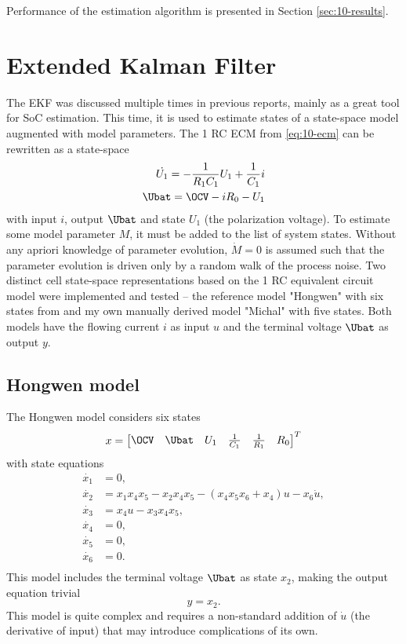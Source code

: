 Performance of the estimation algorithm is presented in Section \ref{sec:10-results}.

\section{Extended Kalman Filter}
\label{sec:10-ekf}

The EKF was discussed multiple times in previous reports, mainly as a great tool for SoC estimation. This time, it is used to estimate states of a state-space model augmented with model parameters. 
The 1 RC ECM from \eqref{eq:10-ecm} can be rewritten as a state-space
\begin{align}
    \dot{U_1} = - \frac{1}{R_1 C_1} U_1 + \frac{1}{C_1} i \\
    \Ubat = \OCV - i R_0 - U_1
    \label{eq:10-ss}
\end{align}
with input $i$, output $\Ubat$ and state $U_1$ (the polarization voltage). To estimate some model parameter $M$, it must be added to the list of system states. Without any apriori knowledge of parameter evolution, $\dot{M} = 0$ is assumed such that the parameter evolution is driven only by a random walk of the process noise.
Two distinct cell state-space representations based on the 1 RC equivalent circuit model were implemented and tested -- the reference model "Hongwen" with six states from \cite{hongwen} and my own manually derived model "Michal" with five states. Both models have the flowing current $i$ as input $u$ and the terminal voltage $\Ubat$ as output $y$.

\subsection{Hongwen model}
\label{sec:10-ekf-hongwen}
The Hongwen model considers six states
\begin{equation}
    x = \begin{bmatrix}
        \OCV & \Ubat & U_1  & \frac{1}{C_1} & \frac{1}{R_1} & R_0
    \end{bmatrix}^T
\end{equation}
with state equations
\begin{equation}
\begin{aligned}
    \dot{x_1} &= 0, \\
    \dot{x_2} &= x_1 x_4 x_5 - x_2x_4x_5 - (x_4 x_5 x_6 + x_4)u - x_6 \dot{u}, \\
    \dot{x_3} &= x_4 u - x_3 x_4 x_5, \\
    \dot{x_4} &= 0, \\
    \dot{x_5} &= 0, \\
    \dot{x_6} &= 0. \\
\end{aligned}
\end{equation}
This model includes the terminal voltage $\Ubat$ as state $x_2$, making the output equation trivial
\begin{equation}
    y = x_2.
\end{equation}
This model is quite complex and requires a non-standard addition of $\dot{u}$ (the derivative of input) that may introduce complications of its own.

